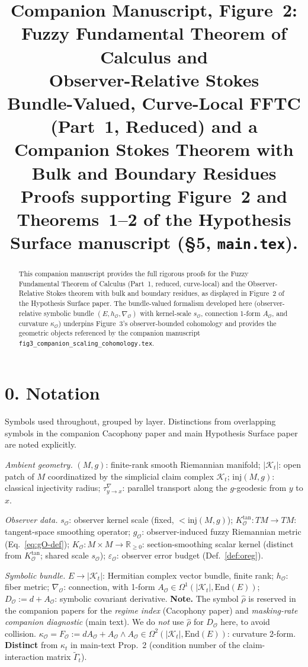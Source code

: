 \documentclass[11pt]{article}
\title{Companion Manuscript, Figure~2: \\
Fuzzy Fundamental Theorem of Calculus and \\
Observer-Relative Stokes\\[0.4em]
\large Bundle-Valued, Curve-Local FFTC (Part~1, Reduced) and a
Companion Stokes Theorem with Bulk and Boundary Residues\\[0.2em]
\normalsize Proofs supporting Figure~2 and Theorems~1--2 of the
Hypothesis Surface manuscript (\S5, \texttt{main.tex}).}
\date{}
\newcommand{\Kt}{\mathcal{K}_t}
\newcommand{\sO}{s_{\mathcal{O}}}  %
\newcommand{\Obs}{\mathcal{O}}
\newcommand{\Eps}{\varepsilon_{\Obs}}
\newcommand{\kappaO}{\kappa_{\Obs}}
\newcommand{\FO}{F_{\Obs}}
\newcommand{\nablaO}{\nabla_{\Obs}}
\newcommand{\AO}{A_{\Obs}}
\newcommand{\gO}{g_{\Obs}}
\newcommand{\hO}{h_{\Obs}}
\newcommand{\KO}{K_{\Obs}}
\newcommand{\DO}{D_{\Obs}}
\newcommand{\EE}{E}
\newcommand{\End}{\mathrm{End}}
\begin{document}
\maketitle

\begin{abstract}
\noindent This companion manuscript provides the full rigorous
proofs for the Fuzzy Fundamental Theorem of Calculus (Part~1,
reduced, curve-local) and the Observer-Relative Stokes theorem
with bulk and boundary residues, as displayed in Figure~2 of the
Hypothesis Surface paper. The bundle-valued formalism developed
here (observer-relative symbolic bundle $(\EE, \hO, \nablaO)$
with kernel-scale $\sO$, connection 1-form $\AO$, and curvature
$\kappaO$) underpins Figure~3's observer-bounded cohomology
and provides the geometric objects referenced by the companion
manuscript \texttt{fig3\_companion\_scaling\_cohomology.tex}.
\end{abstract}

\section*{0. Notation}

Symbols used throughout, grouped by layer. Distinctions from
overlapping symbols in the companion Cacophony paper and main
Hypothesis Surface paper are noted explicitly.

\smallskip
\noindent\emph{Ambient geometry.}
$(M, g)$: finite-rank smooth Riemannian manifold;
$|\Kt|$: open patch of $M$ coordinatized by the simplicial claim
complex $\Kt$;
$\mathrm{inj}(M, g)$: classical injectivity radius;
$\tau^{\nabla}_{y \to x}$: parallel transport along the $g$-geodesic
from $y$ to $x$.

\smallskip
\noindent\emph{Observer data.}
$\sO$: observer kernel scale (fixed, $< \mathrm{inj}(M, g)$);
$\KO^{\mathrm{tan}}: TM \to TM$: tangent-space smoothing operator;
$\gO$: observer-induced fuzzy Riemannian metric (Eq.~\eqref{eq:gO-def});
$\KO: M \times M \to \mathbb{R}_{\geq 0}$: section-smoothing scalar
kernel (distinct from $\KO^{\mathrm{tan}}$; shared scale $\sO$);
$\Eps$: observer error budget (Def.~\ref{def:oreg}).

\smallskip
\noindent\emph{Symbolic bundle.}
$\EE \to |\Kt|$: Hermitian complex vector bundle, finite rank;
$\hO$: fiber metric;
$\nablaO$: connection, with 1-form $\AO \in \Omega^1(|\Kt|, \End(\EE))$;
$\DO := d + \AO$: symbolic covariant derivative. \textbf{Note.} The
symbol $\hat\rho$ is reserved in the companion papers for the
\emph{regime index} (Cacophony paper) and \emph{masking-rate companion
diagnostic} (main text). We do \emph{not} use $\hat\rho$ for $\DO$
here, to avoid collision.
$\kappaO = \FO := d\AO + \AO \wedge \AO \in \Omega^2(|\Kt|, \End(\EE))$:
curvature 2-form. \textbf{Distinct} from $\kappa_t$ in main-text
Prop.~2 (condition number of the claim-interaction matrix $\tilde\Gamma_t$).
\end{document}
